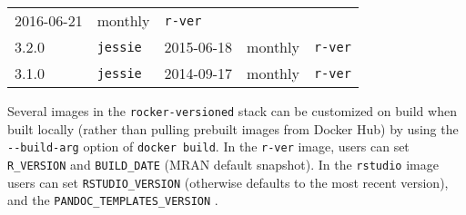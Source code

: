 \begin{longtable}[]{@{}lllll@{}}
\begin{minipage}[t]{0.15\columnwidth}
2016-06-21\strut
\end{minipage} & \begin{minipage}[t]{0.19\columnwidth}\raggedright\strut
monthly\strut
\end{minipage} & \begin{minipage}[t]{0.32\columnwidth}\raggedright\strut
\texttt{r-ver}\strut
\end{minipage}\tabularnewline
\begin{minipage}[t]{0.09\columnwidth}\raggedright\strut
3.2.0\strut
\end{minipage} & \begin{minipage}[t]{0.12\columnwidth}\raggedright\strut
\texttt{jessie}\strut
\end{minipage} & \begin{minipage}[t]{0.15\columnwidth}\raggedright\strut
2015-06-18\strut
\end{minipage} & \begin{minipage}[t]{0.19\columnwidth}\raggedright\strut
monthly\strut
\end{minipage} & \begin{minipage}[t]{0.32\columnwidth}\raggedright\strut
\texttt{r-ver}\strut
\end{minipage}\tabularnewline
\begin{minipage}[t]{0.09\columnwidth}\raggedright\strut
3.1.0\strut
\end{minipage} & \begin{minipage}[t]{0.12\columnwidth}\raggedright\strut
\texttt{jessie}\strut
\end{minipage} & \begin{minipage}[t]{0.15\columnwidth}\raggedright\strut
2014-09-17\strut
\end{minipage} & \begin{minipage}[t]{0.19\columnwidth}\raggedright\strut
monthly\strut
\end{minipage} & \begin{minipage}[t]{0.32\columnwidth}\raggedright\strut
\texttt{r-ver}\strut
\end{minipage}\tabularnewline
\bottomrule
\end{longtable}

Several images in the \texttt{rocker-versioned} stack can be customized
on build when built locally (rather than pulling prebuilt images from
Docker Hub) by using the \texttt{-\/-build-arg} option of
\texttt{docker\ build}. In the \texttt{r-ver} image, users can set
\texttt{R\_VERSION} and \texttt{BUILD\_DATE} (MRAN default snapshot). In
the \texttt{rstudio} image users can set \texttt{RSTUDIO\_VERSION}
(otherwise defaults to the most recent version), and the
\texttt{PANDOC\_TEMPLATES\_VERSION} .

